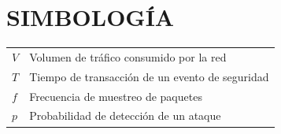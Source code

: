 \chapter{SIMBOLOG\'IA}
\renewcommand{\arraystretch}{1.5}
\begin{table}[htbp]
\begin{tabular}{ll}
$V$ & Volumen de tr\'afico consumido por la red \\
$T$ & Tiempo de transacci\'on de un evento de seguridad \\
$f$ & Frecuencia de muestreo de paquetes \\
$p$ & Probabilidad de detecci\'on de un ataque \\
\end{tabular}
\end{table}